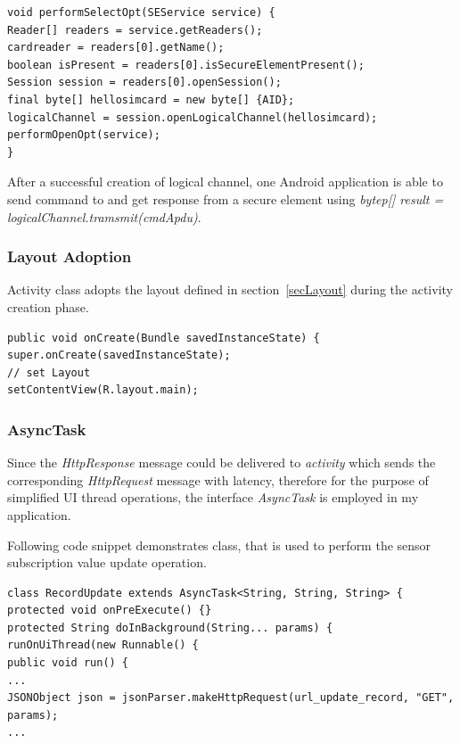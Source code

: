 \begin{Verbatim}[fontsize=\relsize{-1},frame=lines,framesep=4mm, label=\fbox{\small\emph{Service and logical channel Creation}}]
void performSelectOpt(SEService service) {
Reader[] readers = service.getReaders();
cardreader = readers[0].getName();
boolean isPresent = readers[0].isSecureElementPresent();
Session session = readers[0].openSession();
final byte[] hellosimcard = new byte[] {AID};
logicalChannel = session.openLogicalChannel(hellosimcard);
performOpenOpt(service);
}
\end{Verbatim}
After a successful creation of logical channel, one Android application is able to send command to and get response from a secure element using \emph{bytep[] result = logicalChannel.tramsmit(cmdApdu)}.
\subsubsection{Layout Adoption}
Activity class adopts the layout defined in section~\ref{secLayout} during the activity creation phase.

\begin{Verbatim}[fontsize=\relsize{-1},frame=lines,framesep=4mm, label=\fbox{\small\emph{Layout Adoption}}]
public void onCreate(Bundle savedInstanceState) {
super.onCreate(savedInstanceState);
// set Layout
setContentView(R.layout.main);
\end{Verbatim}

\subsubsection{AsyncTask}
Since the \emph{HttpResponse} message could be delivered to \emph{activity} which sends the  corresponding \emph{HttpRequest} message with latency, therefore for the purpose of simplified UI thread operations, the interface \emph{AsyncTask} is employed in my application.

Following code snippet demonstrates class, that is used to perform the sensor subscription value update operation. 
\begin{Verbatim}[fontsize=\relsize{-1},frame=lines,framesep=4mm, label=\fbox{\small\emph{AsyncTask HttpRequest}}]
class RecordUpdate extends AsyncTask<String, String, String> {
protected void onPreExecute() {}	
protected String doInBackground(String... params) {
runOnUiThread(new Runnable() {
public void run() {
...
JSONObject json = jsonParser.makeHttpRequest(url_update_record, "GET", params);
...
\end{Verbatim}
